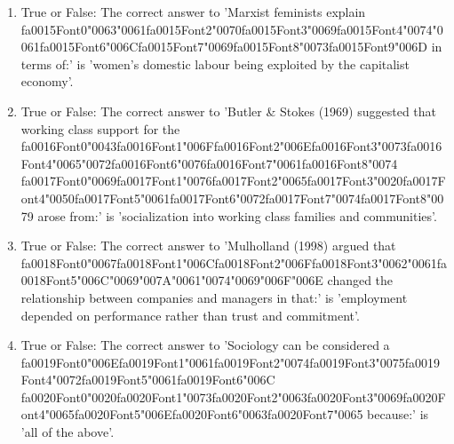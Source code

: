 \documentclass[12pt]{article}
\begin{document}
\begin{enumerate}[label=\arabic*.]
\item True or False: The correct answer to 'Marxist feminists explain {\csname fa0015Font0\endcsname\char"0063}{\char"0061}{\csname fa0015Font2\endcsname\char"0070}{\csname fa0015Font3\endcsname\char"0069}{\csname fa0015Font4\endcsname\char"0074}{\char"0061}{\csname fa0015Font6\endcsname\char"006C}{\csname fa0015Font7\endcsname\char"0069}{\csname fa0015Font8\endcsname\char"0073}{\csname fa0015Font9\endcsname\char"006D} in terms of:' is 'women's domestic labour being exploited by the capitalist economy'.
\item True or False: The correct answer to 'Butler \& Stokes (1969) suggested that working class support for the {\csname fa0016Font0\endcsname\char"0043}{\csname fa0016Font1\endcsname\char"006F}{\csname fa0016Font2\endcsname\char"006E}{\csname fa0016Font3\endcsname\char"0073}{\csname fa0016Font4\endcsname\char"0065}{\char"0072}{\csname fa0016Font6\endcsname\char"0076}{\csname fa0016Font7\endcsname\char"0061}{\csname fa0016Font8\endcsname\char"0074} {\csname fa0017Font0\endcsname\char"0069}{\csname fa0017Font1\endcsname\char"0076}{\csname fa0017Font2\endcsname\char"0065}{\csname fa0017Font3\endcsname\char"0020}{\csname fa0017Font4\endcsname\char"0050}{\csname fa0017Font5\endcsname\char"0061}{\csname fa0017Font6\endcsname\char"0072}{\csname fa0017Font7\endcsname\char"0074}{\csname fa0017Font8\endcsname\char"0079} arose from:' is 'socialization into working class families and communities'.
\item True or False: The correct answer to 'Mulholland (1998) argued that {\csname fa0018Font0\endcsname\char"0067}{\csname fa0018Font1\endcsname\char"006C}{\csname fa0018Font2\endcsname\char"006F}{\csname fa0018Font3\endcsname\char"0062}{\char"0061}{\csname fa0018Font5\endcsname\char"006C}{\char"0069}{\char"007A}{\char"0061}{\char"0074}{\char"0069}{\char"006F}{\char"006E} changed the relationship between companies and managers in that:' is 'employment depended on performance rather than trust and commitment'.
\item True or False: The correct answer to 'Sociology can be considered a {\csname fa0019Font0\endcsname\char"006E}{\csname fa0019Font1\endcsname\char"0061}{\csname fa0019Font2\endcsname\char"0074}{\csname fa0019Font3\endcsname\char"0075}{\csname fa0019Font4\endcsname\char"0072}{\csname fa0019Font5\endcsname\char"0061}{\csname fa0019Font6\endcsname\char"006C} {\csname fa0020Font0\endcsname\char"0020}{\csname fa0020Font1\endcsname\char"0073}{\csname fa0020Font2\endcsname\char"0063}{\csname fa0020Font3\endcsname\char"0069}{\csname fa0020Font4\endcsname\char"0065}{\csname fa0020Font5\endcsname\char"006E}{\csname fa0020Font6\endcsname\char"0063}{\csname fa0020Font7\endcsname\char"0065} because:' is 'all of the above'.

\end{enumerate}
\end{document}
